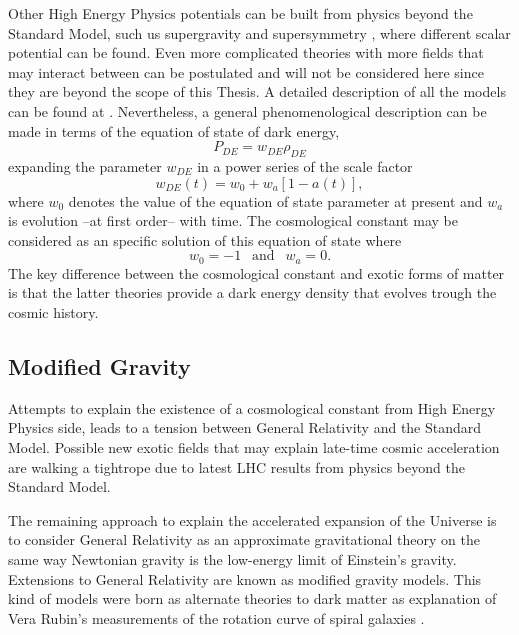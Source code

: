 Other High Energy Physics potentials can be built from physics beyond the Standard Model, such us supergravity and supersymmetry \cite{1999PhLB..468...40B,1999astro.ph.12005B,2000PhRvD..61j3502B,1999PhRvD..60f3502B}, where different scalar potential can be found. Even more complicated theories with more fields that may interact between can be postulated and will not be considered here since they are beyond the scope of this Thesis. A detailed description of all the models can be found at \cite{2010deto.book.....A}. Nevertheless, a general phenomenological description can be made in terms of the equation of state of dark energy,
\begin{equation}
P_{DE} = w_{DE}\rho_{DE}
\end{equation}
expanding the parameter $w_{DE}$ in a power series of the scale factor
\begin{equation}
w_{DE}(t) = w_0 +w_a[1-a(t)],
\end{equation}
where $w_0$ denotes the value of the equation of state parameter at present and $w_a$ is evolution --at first order-- with time. The cosmological constant may be considered as an specific solution of this equation of state where
\begin{equation}
w_0=-1\ \ \mbox{ and }\ \ w_a=0.
\end{equation}
The key difference between the cosmological constant and exotic forms of matter is that the latter theories provide a dark energy density that evolves trough the cosmic history.

\subsection{Modified Gravity}
Attempts to explain the existence of a cosmological constant from High Energy Physics side, leads to a tension between General Relativity and the Standard Model. Possible new exotic fields that may explain late-time cosmic acceleration are walking a tightrope due to latest LHC results from physics beyond the Standard Model.
\newline

The remaining approach to explain the accelerated expansion of the Universe is to consider General Relativity as an approximate gravitational theory on the same way Newtonian gravity is the low-energy limit of Einstein's gravity. Extensions to General Relativity are known as modified gravity models. This kind of models were born as alternate theories to dark matter as explanation of Vera Rubin's measurements of the rotation curve of spiral galaxies \cite{1982ApJ...253...70B,1983Sci...220.1339R,1985ApJ...289...81R,1985ApJ...297..423B}. 
\newline

